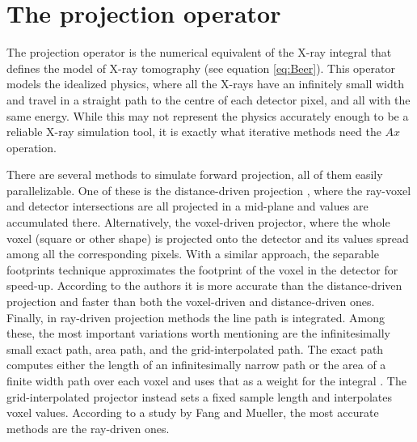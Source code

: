 
\section{The projection operator}
The projection operator is the numerical equivalent of the X-ray integral that defines the model of X-ray tomography (see equation \ref{eq:Beer}). This operator models the idealized physics, where all the X-rays have an infinitely small width and travel in a straight path to the centre of each detector pixel, and all with the same energy. While this may not represent the physics accurately enough to be a reliable X-ray  simulation tool, it is exactly what iterative methods need the $Ax$ operation. 


There are several methods to simulate forward projection, all of them easily parallelizable. One of these is the distance-driven projection \cite{BrunoDeMan}\cite{schlifske2016fast}, where the ray-voxel and detector intersections are all projected in a mid-plane and values are accumulated there. Alternatively, the voxel-driven projector\cite{Du2017}, where the whole voxel (square or other shape\cite{lewitt1992alternatives}) is projected onto the detector and its values spread among all the corresponding pixels. With a similar approach, the separable footprints technique\cite{long20103d}\cite{wu2011gpu} approximates the footprint of the voxel in the detector for speed-up.  According to the authors it is more accurate than the distance-driven projection and faster than both the voxel-driven and distance-driven ones. Finally, in ray-driven projection\cite{siddon1985fast}\cite{xu2010fast}\cite{chou2011fast} methods the line path is integrated. Among these, the most important variations worth mentioning are the infinitesimally small exact path, area path, and the grid-interpolated path. The exact path computes either the length of an infinitesimally narrow path or the area of a finite width path over each voxel and uses that as a weight for the integral . The grid-interpolated projector instead sets a fixed sample length and interpolates voxel values. According to a study by Fang and Mueller\cite{1625152}, the most accurate methods are the ray-driven ones.

